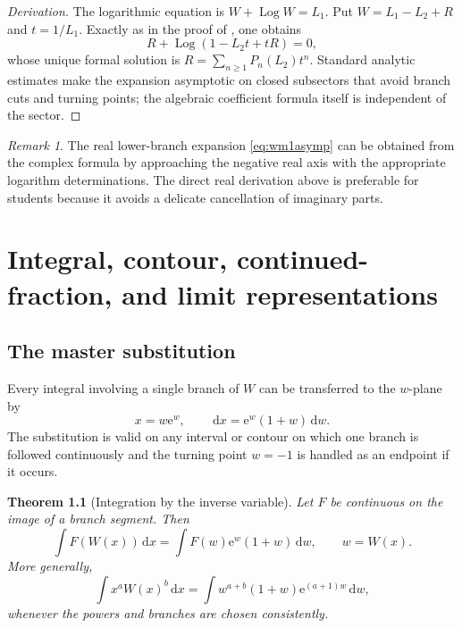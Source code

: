 \documentclass[11pt,openany]{book}
\newcommand{\e}{\mathrm{e}}
\newcommand{\dd}{\,\mathrm{d}}
\DeclareMathOperator{\Log}{Log}
\theoremstyle{plain}
\newtheorem{theorem}{Theorem}[chapter]
\theoremstyle{definition}
\theoremstyle{remark}
\newtheorem{remark}[theorem]{Remark}
\begin{document}
\begin{proof}[Derivation]
The logarithmic equation is
\(W+\Log W=L_1\).  Put
\(W=L_1-L_2+R\) and \(t=1/L_1\).  Exactly as in the proof of
, one obtains
\[
 R+\Log(1-L_2t+tR)=0,
\]
whose unique formal solution is
\(R=\sum_{n\ge1}P_n(L_2)t^n\).  Standard analytic estimates make the
expansion asymptotic on closed subsectors that avoid branch cuts and turning
points; the algebraic coefficient formula itself is independent of the
sector.
\end{proof}

\begin{remark}
The real lower-branch expansion \eqref{eq:wm1asymp} can be obtained from the
complex formula by approaching the negative real axis with the appropriate
logarithm determinations.  The direct real derivation above is preferable for
students because it avoids a delicate cancellation of imaginary parts.
\end{remark}

\chapter[Integral and other representations]{Integral, contour, continued-fraction, and limit representations}
\label{chap:representations}

\section{The master substitution}
Every integral involving a single branch of \(W\) can be transferred to the
\(w\)-plane by
\begin{equation}\label{eq:mastersub}
       x=w\e^w,
       \qquad
       \dd x=\e^w(1+w)\dd w.
\end{equation}
The substitution is valid on any interval or contour on which one branch is
followed continuously and the turning point \(w=-1\) is handled as an
endpoint if it occurs.

\begin{theorem}[Integration by the inverse variable]\label{thm:Wintegration}
Let \(F\) be continuous on the image of a branch segment.  Then
\begin{equation}\label{eq:Wintegration}
 \int F(W(x))\dd x
 =\int F(w)\e^w(1+w)\dd w,
 \qquad w=W(x).
\end{equation}
More generally,
\begin{equation}\label{eq:weightedWintegration}
 \int x^a W(x)^b\dd x
 =\int w^{a+b}(1+w)\e^{(a+1)w}\dd w,
\end{equation}
whenever the powers and branches are chosen consistently.
\end{theorem}
\end{document}
